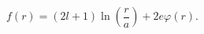\begin{equation}
\label{Eq_A05}
f(r) = (2l+1) \ln \left(\frac{r}{a}\right) + 2e \varphi(r).
\end{equation}

